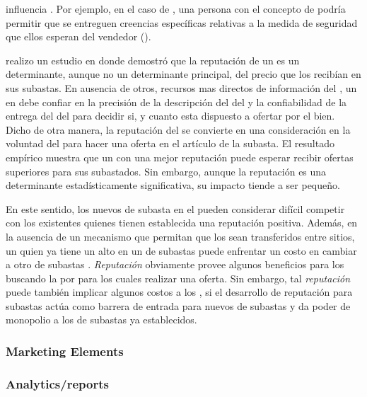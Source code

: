 \security influencia \trust. Por ejemplo, en el caso de \amazonNAME, una persona \familiarity con el concepto de \secureintcom podría permitir que se entreguen creencias específicas relativas a la medida de seguridad que ellos esperan del vendedor (\trust)\cite{gefen2000commerce}.

\ebay realizo un estudio en donde demostró que la reputación \ecommerce de un \seller es un determinante, aunque no un determinante principal, del precio que los \sellers recibían en sus subastas. En ausencia de otros, recursos mas directos de información del \itemsCOM, un \consumer en \internet debe confiar en la precisión de la descripción del \itemsCOM del \sellers y la confiabilidad de la entrega del \itemsCOM del \sellers para decidir si, y cuanto esta dispuesto a ofertar por el bien. Dicho de otra manera, la reputación del \sellers se convierte en una consideración en la voluntad del \consumer para hacer una oferta en el artículo de la subasta. El resultado empírico muestra que un \seller con una mejor reputación puede esperar recibir ofertas superiores para sus \itemsCOM subastados. Sin embargo, aunque la reputación es una determinante estadísticamente significativa, su impacto tiende a ser pequeño\cite{melnik2002does}.

En este sentido, los nuevos \seller de subasta en el \websitesINT pueden considerar difícil competir con los \sellers existentes quienes tienen establecida una reputación positiva. Además, en la ausencia de un mecanismo que permitan que los \ratings sean transferidos entre sitios, un \seller quien ya tiene un alto \rating en un \websiteINT de subastas \online puede enfrentar un costo en cambiar a otro \websiteINT de subastas \online. \textit{Reputación} obviamente provee algunos beneficios para los \consumers buscando la \internet por \itemsCOM para los cuales realizar una oferta. Sin embargo, tal \textit{reputación} puede también implicar algunos costos a los \consumers, si el desarrollo de reputación para subastas \online actúa como barrera de entrada para nuevos \websitesINT de  subastas \online  y da poder de monopolio a los \websitesINT de subastas \online ya establecidos\cite{melnik2002does}.

\subsubsection{Marketing Elements}

\subsubsection{Analytics/reports}






